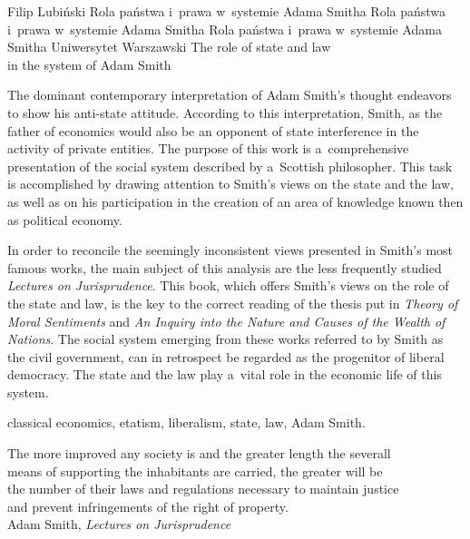 \begin{artplenv}{Filip Lubiński}
	{Rola państwa i~prawa w~systemie Adama Smitha}
	{Rola państwa i~prawa w~systemie Adama Smitha}
	{Rola państwa i~prawa w~systemie Adama Smitha}
	{Uniwersytet Warszawski}
	{The role of state and law\\in the system of Adam Smith}
	{The dominant contemporary interpretation of Adam Smith's thought endeavors to show his anti-state attitude.
		According to this interpretation, Smith, as the father of economics would also be an opponent of state interference in
		the activity of private entities. The purpose of this work is a~comprehensive presentation of the social system
		described by a~Scottish philosopher. This task is accomplished by drawing attention to Smith's views on the state and
		the law, as well as on his participation in the creation of an area of knowledge known then as political economy.
		
		In order to reconcile the seemingly inconsistent views presented in Smith's most famous works, the main subject of
		this analysis are the less frequently studied \textit{Lectures on Jurisprudence}. This book, which offers Smith's views
		on the role of the state and law, is the key to the correct reading of the thesis put in \textit{Theory of Moral
			Sentiments} and \textit{An Inquiry into the Nature and Causes of the Wealth of Nations}. The social system emerging
		from these works referred to by Smith as the civil government, can in retrospect be regarded as the progenitor of
		liberal democracy. The state and the law play a~vital role in the economic life of this system.}
	{classical economics, etatism, liberalism, state, law, Adam Smith.}
	

\begin{footnotesize}
\begin{flushright}
	The more improved any society is and the greater length the severall\\
	means of supporting the inhabitants are carried, the greater will be\\
	the number of their laws and regulations necessary to maintain justice\\
	and prevent infringements of the right of property.\\
	Adam Smith, \textit{Lectures on Jurisprudence}
	
\end{flushright}	
\end{footnotesize}





\end{artplenv}
